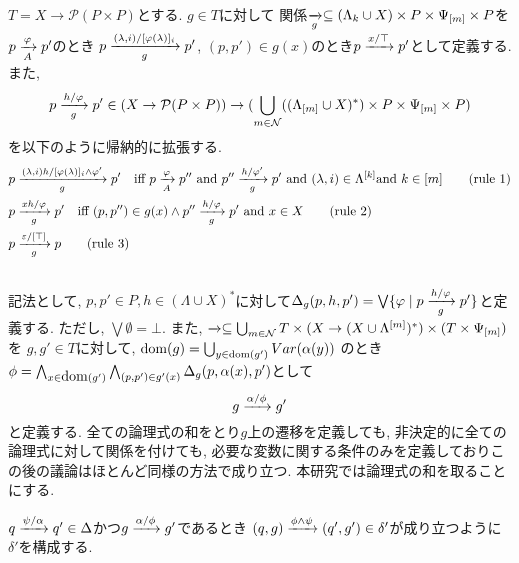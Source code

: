 \documentclass[uplatex,dvipdfmx,a4j]{jsreport}
\begin{document}
  $T = X \rightarrow \mathcal{P}(P \times P)$とする.
  $g \in T$に対して
  関係$\transarrow{}{g} \subseteq (\Lambda_{k} \cup X) \times P \times \Psi_{[m]} \times P$を
  $p \transarrow{\varphi}{A} p'$のとき
  $p \transarrow{(\lambda, i) / [\varphi(\lambda)]_i}{g} p'$,
  $(p, p') \in g(x)$のとき$p \transarrow{x / \top}{} p'$として定義する.
  また,
  \[
    p \transarrow{h / \varphi}{g} p' \in (X \rightarrow \mathcal{P}(P \times P))
      \rightarrow (\bigcup_{m \in \mathcal{N}}
      ((\Lambda_{[m]} \cup X)^*) \times P \times \Psi_{[m]} \times P)
  \]
  を以下のように帰納的に拡張する. \\
  \setcounter{equation}{0}
  \begin{align}
    p &\transarrow{
      (\lambda, i) h / [\varphi(\lambda)]_i \land \varphi'
    }{g} p' \quad
      \mbox{iff} \
        p \transarrow{\varphi}{A} p'' \
      \mbox{and} \
        p'' \transarrow{h / \varphi'}{g} p' \
      \mbox{and} \
        (\lambda, i) \in \Lambda^{[k]}
      \mbox{and} \
        k \in [m]   \tag{\mbox{rule 1}} \label{rule: 1} \\
    p &\transarrow{x h / \varphi}{g} p' \quad
      \mbox{iff} \
        (p, p'') \in g(x) \land p'' \transarrow{h / \varphi}{g} p' \
      \mbox{and} \
        x \in X \tag{\mbox{rule 2}} \label{rule: 2} \\
    p &\transarrow{\varepsilon / [\top]}{g} p \tag{\mbox{rule 3}} \label{rule: 3}
  \end{align} \\
  記法として, $p, p' \in P, h \in (\Lambda \cup X)^*$に対して$\Delta_g(p, h, p') = \bigvee \{
    \varphi \mid p \transarrow{h / \varphi}{g} p'
  \}$と定義する. ただし, $\bigvee \emptyset = \bot$.
  また, $\transarrow{}{} \subseteq \bigcup_{m \in \mathcal{N}} T \times
    (X \rightarrow (X \cup \Lambda^{[m]})^*) \times (T \times \Psi_{[m]})$を
  $g, g' \in T$に対して,
  $\dom(g) = \bigcup_{y \in \scriptsize \dom(g')} Var(\alpha(y))$
  のとき
  $\phi =
    \bigwedge_{x \in \dom(g')} \bigwedge_{(p, p') \in g'(x)}
      \Delta_g(p, \alpha(x), p')
  $として
  \[
    g \transarrow{\alpha / \phi}{} g'
  \]
  と定義する.
  全ての論理式の和をとり$g$上の遷移を定義しても, 非決定的に全ての論理式に対して関係を付けても,
  必要な変数に関する条件のみを定義しておりこの後の議論はほとんど同様の方法で成り立つ. 本研究では論理式の和を取ることにする.

  $q \transarrow{\psi / \alpha}{} q' \in \Delta$かつ$g \transarrow{\alpha / \phi}{} g'$であるとき
  $(q, g) \transarrow{\phi \land \psi}{} (q', g') \in \delta'$が成り立つように$\delta'$を構成する.
\end{document}

